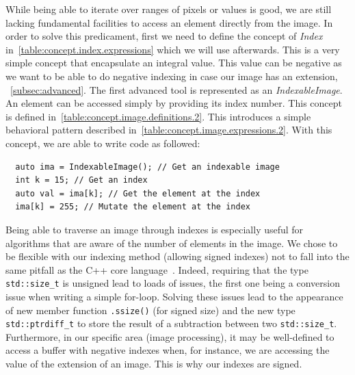 While being able to iterate over ranges of pixels or values is good, we are still lacking fundamental facilities to
access an element directly from the image. In order to solve this predicament, first we need to define the concept of
\emph{Index} in~\cref{table:concept.index.expressions} which we will use afterwards. This is a very simple concept that
encapsulate an integral value. This value can be negative as we want to be able to do negative indexing in case our
image has an extension, \cf~\cref{subsec:advanced}. The first advanced tool is represented as an \emph{IndexableImage}.
An element can be accessed simply by providing its index number. This concept is defined
in~\cref{table:concept.image.definitions.2}. This introduces a simple behavioral pattern described
in~\cref{table:concept.image.expressions.2}. With this concept, we are able to write code as followed:
\begin{verbatim}
  auto ima = IndexableImage(); // Get an indexable image
  int k = 15; // Get an index
  auto val = ima[k]; // Get the element at the index
  ima[k] = 255; // Mutate the element at the index
\end{verbatim}
Being able to traverse an image through indexes is especially useful for algorithms that are aware of the number of
elements in the image. We chose to be flexible with our indexing method (\ie allowing signed indexes) not to fall into
the same pitfall as the C++ core language~\parencite{stroustrup.2019.signed-unsigned-mess}. Indeed, requiring that the
type \texttt{std::size\_t} is unsigned lead to loads of issues, the first one being a conversion issue when writing a
simple for-loop. Solving these issues lead to the appearance of new member function \texttt{.ssize()} (for signed size)
and the new type \texttt{std::ptrdiff\_t} to store the result of a subtraction between two \texttt{std::size\_t}.
Furthermore, in our specific area (image processing), it may be well-defined to access a buffer with negative indexes
when, for instance, we are accessing the value of the extension of an image. This is why our indexes are signed.


